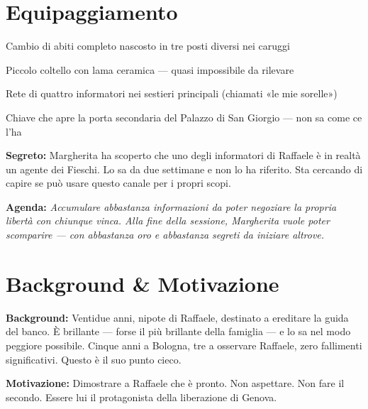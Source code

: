 \section*{Equipaggiamento}
\begin{goldlist}
\item Cambio di abiti completo nascosto in tre posti diversi nei caruggi
\item Piccolo coltello con lama ceramica — quasi impossibile da rilevare
\item Rete di quattro informatori nei sestieri principali (chiamati «le mie sorelle»)
\item Chiave che apre la porta secondaria del Palazzo di San Giorgio — non sa come ce l'ha
\end{goldlist}

\clearpage
\begin{secretbox}
\textbf{Segreto:} Margherita ha scoperto che uno degli informatori di Raffaele è in realtà un agente dei Fieschi. Lo sa da due settimane e non lo ha riferito. Sta cercando di capire se può usare questo canale per i propri scopi.

\medskip\noindent\textcolor{SecretRed}{\textbf{Agenda:}} \textit{Accumulare abbastanza informazioni da poter negoziare la propria libertà con chiunque vinca. Alla fine della sessione, Margherita vuole poter scomparire — con abbastanza oro e abbastanza segreti da iniziare altrove.}
\end{secretbox}

\clearpage



\section*{Background \& Motivazione}
\begin{rulebox}{}
\textbf{Background:} Ventidue anni, nipote di Raffaele, destinato a ereditare la guida del banco. È brillante — forse il più brillante della famiglia — e lo sa nel modo peggiore possibile. Cinque anni a Bologna, tre a osservare Raffaele, zero fallimenti significativi. Questo è il suo punto cieco.

\medskip\noindent\textcolor{SpinolaRed}{\textbf{Motivazione:}} Dimostrare a Raffaele che è pronto. Non aspettare. Non fare il secondo. Essere lui il protagonista della liberazione di Genova.
\end{rulebox}

